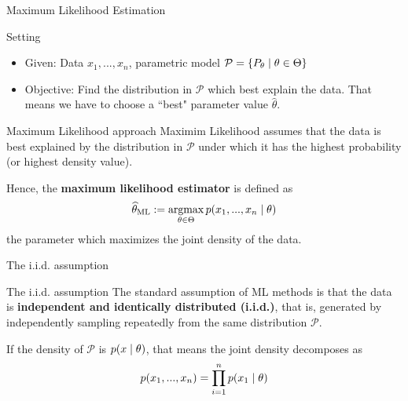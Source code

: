 \documentclass[10pt]{beamer}
\renewcommand{\bf}[1]{\textbf{{#1}}}
\begin{document}
\begin{frame}{Maximum Likelihood Estimation}
\begin{sblock}{Setting}
\begin{itemize}
\item Given: Data $x_1, ..., x_n$, parametric model $\mathcal{P} = \{ {P_\theta \; | \; \theta \in \Theta} \}$
\item Objective: Find the distribution in $\mathcal{P}$ which best explain the data.  That means we have to choose a ``best" parameter value $\widehat{\theta}$.
\end{itemize}
\end{sblock}

\begin{sblock}{Maximum Likelihood approach}
Maximim Likelihood assumes that the data is best explained by the distribution in $\mathcal{P}$ under which it has the highest probability (or highest density value).

Hence, the \bf{maximum likelihood estimator} is defined as
\[ \widehat{\theta}_{\text{ML}} := \operatorname*{argmax}_{\theta \in \Theta} p(x_1, ..., x_n \; | \; \theta) \]
the parameter which maximizes the joint density of the data.
\end{sblock}

\end{frame}


\begin{frame}{The i.i.d. assumption}

\begin{sblock}{The i.i.d. assumption}
The standard assumption of ML methods is that the data is \bf{independent and identically distributed (i.i.d.)}, that is, generated by independently sampling repeatedly from the same distribution $\mathcal{P}$. 

If the density of $\mathcal{P}$ is $p(x \; | \; \theta)$, that means the joint density decomposes as 
\[  p(x_1, ..., x_n) = \displaystyle\prod_{i=1}^n p(x_1 \; | \; \theta) \]
\end{sblock}

\end{frame}
\end{document}
